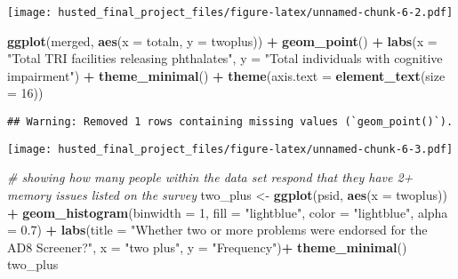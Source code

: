 \documentclass[
]{article}
\newenvironment{Shaded}{\begin{snugshade}}{\end{snugshade}}
\newcommand{\AttributeTok}[1]{\textcolor[rgb]{0.13,0.29,0.53}{#1}}
\newcommand{\CommentTok}[1]{\textcolor[rgb]{0.56,0.35,0.01}{\textit{#1}}}
\newcommand{\DecValTok}[1]{\textcolor[rgb]{0.00,0.00,0.81}{#1}}
\newcommand{\FloatTok}[1]{\textcolor[rgb]{0.00,0.00,0.81}{#1}}
\newcommand{\FunctionTok}[1]{\textcolor[rgb]{0.13,0.29,0.53}{\textbf{#1}}}
\newcommand{\NormalTok}[1]{#1}
\newcommand{\OtherTok}[1]{\textcolor[rgb]{0.56,0.35,0.01}{#1}}
\newcommand{\SpecialCharTok}[1]{\textcolor[rgb]{0.81,0.36,0.00}{\textbf{#1}}}
\newcommand{\StringTok}[1]{\textcolor[rgb]{0.31,0.60,0.02}{#1}}
\begin{document}
\texttt{[image: husted\_final\_project\_files/figure-latex/unnamed-chunk-6-2.pdf]}

\begin{Shaded}
\begin{Highlighting}[]
\FunctionTok{ggplot}\NormalTok{(merged, }\FunctionTok{aes}\NormalTok{(}\AttributeTok{x =}\NormalTok{ totaln, }\AttributeTok{y =}\NormalTok{ twoplus)) }\SpecialCharTok{+}
  \FunctionTok{geom\_point}\NormalTok{() }\SpecialCharTok{+}
  \FunctionTok{labs}\NormalTok{(}\AttributeTok{x =} \StringTok{"Total TRI facilities releasing phthalates"}\NormalTok{,}
       \AttributeTok{y =} \StringTok{"Total individuals with cognitive impairment"}\NormalTok{) }\SpecialCharTok{+}
  \FunctionTok{theme\_minimal}\NormalTok{() }\SpecialCharTok{+}
  \FunctionTok{theme}\NormalTok{(}\AttributeTok{axis.text =} \FunctionTok{element\_text}\NormalTok{(}\AttributeTok{size =} \DecValTok{16}\NormalTok{))}
\end{Highlighting}
\end{Shaded}

\begin{verbatim}
## Warning: Removed 1 rows containing missing values (`geom_point()`).
\end{verbatim}

\texttt{[image: husted\_final\_project\_files/figure-latex/unnamed-chunk-6-3.pdf]}

\begin{Shaded}
\begin{Highlighting}[]
\CommentTok{\# showing how many people within the data set respond that they have 2+ memory issues listed on the survey}
\NormalTok{two\_plus }\OtherTok{\textless{}{-}} \FunctionTok{ggplot}\NormalTok{(psid, }\FunctionTok{aes}\NormalTok{(}\AttributeTok{x =}\NormalTok{ twoplus)) }\SpecialCharTok{+}
  \FunctionTok{geom\_histogram}\NormalTok{(}\AttributeTok{binwidth =} \DecValTok{1}\NormalTok{, }\AttributeTok{fill =} \StringTok{"lightblue"}\NormalTok{, }\AttributeTok{color =} \StringTok{"lightblue"}\NormalTok{, }\AttributeTok{alpha =} \FloatTok{0.7}\NormalTok{) }\SpecialCharTok{+}
  \FunctionTok{labs}\NormalTok{(}\AttributeTok{title =} \StringTok{"Whether two or more problems were endorsed for the AD8 Screener?"}\NormalTok{,}
       \AttributeTok{x =} \StringTok{"two plus"}\NormalTok{,}
       \AttributeTok{y =} \StringTok{"Frequency"}\NormalTok{)}\SpecialCharTok{+}
  \FunctionTok{theme\_minimal}\NormalTok{()}
\NormalTok{two\_plus}
\end{Highlighting}
\end{Shaded}
\end{document}
